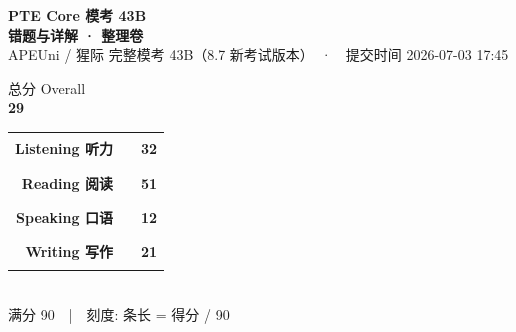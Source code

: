 \documentclass[11pt]{article}
\begin{document}

\begin{titlepage}
\thispagestyle{empty}
\centering
\vspace*{1.4cm}

{\fontsize{30}{36}\selectfont\bfseries\color{cHead} PTE Core 模考 43B}\\[4mm]
{\fontsize{17}{20}\selectfont\color{cAccent}\bfseries 错题与详解 · 整理卷}\\[3mm]
{\color{gray} APEUni / 猩际 完整模考 43B（8.7 新考试版本）　·　提交时间 2026-07-03 17:45}\\[1.2cm]

\begin{tcolorbox}[width=0.62\textwidth, halign=center, enhanced,
  colback=cAccent, colframe=cAccent, arc=6pt, boxrule=0pt, top=10pt, bottom=10pt]
  {\color{white}\large 总分 Overall}\\[2pt]
  {\fontsize{46}{50}\selectfont\bfseries\color{white} 29}
\end{tcolorbox}

\vspace{1.0cm}

\begin{tcolorbox}[width=0.84\textwidth, enhanced, colback=white, colframe=cRule,
  boxrule=0.8pt, arc=4pt, left=18pt, right=18pt, top=14pt, bottom=14pt]
\setlength{\tabcolsep}{6pt}\renewcommand{\arraystretch}{1.7}
\sffamily
\begin{tabular}{@{}r@{\hskip 8pt}l@{\hskip 10pt}l@{}}
 \bfseries Listening 听力 & {\color{mListen}\rule{3.56cm}{0.42cm}} & {\bfseries\large 32}\\
 \bfseries Reading 阅读   & {\color{mRead}\rule{5.67cm}{0.42cm}}   & {\bfseries\large 51}\\
 \bfseries Speaking 口语  & {\color{mSpeak}\rule{1.33cm}{0.42cm}}  & {\bfseries\large 12}\\
 \bfseries Writing 写作   & {\color{mWrite}\rule{2.33cm}{0.42cm}}  & {\bfseries\large 21}\\
\end{tabular}\\[2mm]
{\footnotesize\color{gray} 满分 90　|　刻度: 条长 = 得分 / 90}
\end{tcolorbox}


\end{titlepage}
\end{document}
